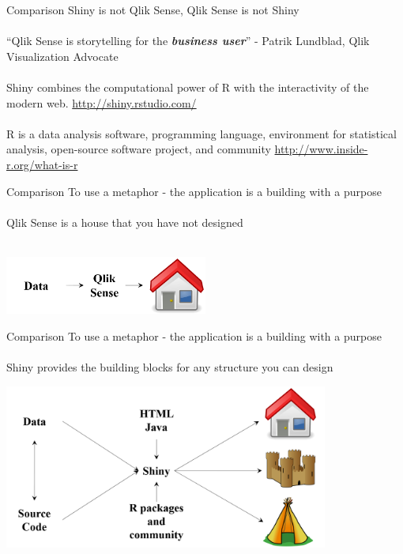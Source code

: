 \documentclass[serif]{beamer}\usepackage[]{graphicx}\usepackage[]{color}
\newcommand{\emtxt}[1]{\textbf{\textit{#1}}}
\begin{document}
\begin{frame}{Comparison}
Shiny is not Qlik Sense, Qlik Sense is not Shiny \\~\\
``Qlik Sense is storytelling for the \emtxt{business user}'' - Patrik Lundblad, Qlik Visualization Advocate \\~\\
Shiny combines the computational power of R with the interactivity of the modern web. \url{http://shiny.rstudio.com/} \\~\\ 
R is a data analysis software, programming language, environment for statistical analysis, open-source software project, and community \url{http://www.inside-r.org/what-is-r}
\end{frame}

\begin{frame}[t]{Comparison}
To use a metaphor - the application is a building with a purpose \\~\\
Qlik Sense is a house that you have not designed \\~\\
\vspace{0.5in}
\centerline{\includegraphics[width = 0.5\textwidth]{fig/qlik_flow.png}}
\end{frame}

\begin{frame}[t]{Comparison}
To use a metaphor - the application is a building with a purpose \\~\\
Shiny provides the building blocks for any structure you can design 
\centerline{\includegraphics[width = 0.8\textwidth]{fig/shiny_flow.png}}
\end{frame}
\end{document}
